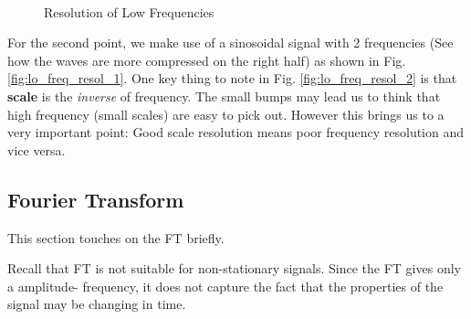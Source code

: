 \documentclass{article}
\begin{document}
		\begin{figure}[t!]
			\centering
			\hspace*{2.0em}
			 \\
			\caption{Resolution of Low Frequencies}
			\label{fig:lo_freq_resol}
		\end{figure}
	
		For the second point, we make use of a sinosoidal signal with 2 frequencies (See how the waves are more compressed on the right half) as shown in Fig.  \ref{fig:lo_freq_resol_1}. One key thing to note in Fig. \ref{fig:lo_freq_resol_2} is that \textbf{scale} is the \textit{inverse} of frequency. The small bumps may lead us to think that high frequency (small scales) are easy to pick out. However this brings us to  a very important point: Good scale resolution means poor frequency resolution and vice versa. 
		
	\subsection{Fourier Transform}
	
	This section touches on the FT briefly. 
	
	Recall that FT is not suitable for non-stationary signals. Since the FT gives only a amplitude- frequency, it does not capture the fact that the properties of the signal may be changing in time.

		
		
		
		
		
	
	
	
\end{document}
